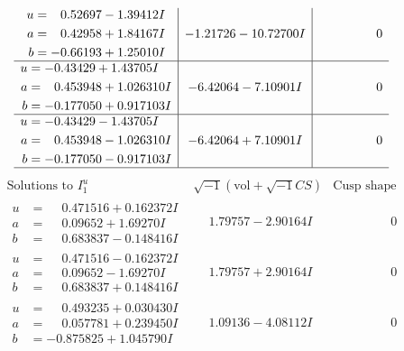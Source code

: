 \documentclass[1p]{elsarticle_modified}
\theoremstyle{definition}
\newcommand{\I}{\sqrt{-1}}
\begin{document}
$$\begin{array}{c|c|c}
\begin{aligned}
u &= \phantom{-}0.52697 - 1.39412 I \\
a &= \phantom{-}0.42958 + 1.84167 I \\
b &= -0.66193 + 1.25010 I\end{aligned}
 & -1.21726 - 10.72700 I & \phantom{-0.000000 } 0 \\ \hline\begin{aligned}
u &= -0.43429 + 1.43705 I \\
a &= \phantom{-}0.453948 + 1.026310 I \\
b &= -0.177050 + 0.917103 I\end{aligned}
 & -6.42064 - 7.10901 I & \phantom{-0.000000 } 0 \\ \hline\begin{aligned}
u &= -0.43429 - 1.43705 I \\
a &= \phantom{-}0.453948 - 1.026310 I \\
b &= -0.177050 - 0.917103 I\end{aligned}
 & -6.42064 + 7.10901 I & \phantom{-0.000000 } 0\\
 \hline 
 \end{array}$$\newpage$$\begin{array}{c|c|c}  
\text{Solutions to }I^u_{1}& \I (\text{vol} + \sqrt{-1}CS) & \text{Cusp shape}\\
 \hline 
\begin{aligned}
u &= \phantom{-}0.471516 + 0.162372 I \\
a &= \phantom{-}0.09652 + 1.69270 I \\
b &= \phantom{-}0.683837 - 0.148416 I\end{aligned}
 & \phantom{-}1.79757 - 2.90164 I & \phantom{-0.000000 } 0 \\ \hline\begin{aligned}
u &= \phantom{-}0.471516 - 0.162372 I \\
a &= \phantom{-}0.09652 - 1.69270 I \\
b &= \phantom{-}0.683837 + 0.148416 I\end{aligned}
 & \phantom{-}1.79757 + 2.90164 I & \phantom{-0.000000 } 0 \\ \hline\begin{aligned}
u &= \phantom{-}0.493235 + 0.030430 I \\
a &= \phantom{-}0.057781 + 0.239450 I \\
b &= -0.875825 + 1.045790 I\end{aligned}
 & \phantom{-}1.09136 - 4.08112 I & \phantom{-0.000000 } 0 \\ \hline\begin{aligned}

\end{aligned}
\end{array}$$
\end{document}
